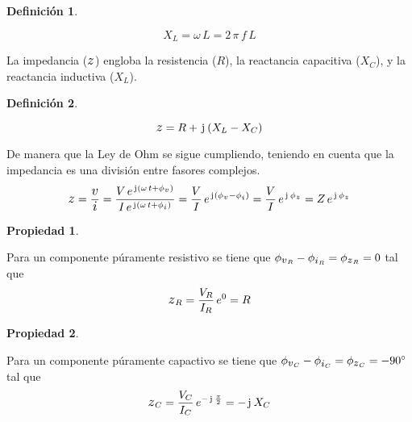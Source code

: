 \documentclass[a5paper,12pt,twoside]{book}
\newtheorem{defn}{{Definición}}[chapter]
\newtheorem{prop}{{Propiedad}}[chapter]
\begin{document}
\begin{mdframed}[style=MyFrame1]
    \begin{defn}
    \end{defn}
    \begin{equation*}
        X_L = \omega \, L = 2 \, \pi \, f \, L
    \end{equation*}
\end{mdframed}

La impedancia ($\impedance$) engloba la resistencia ($R$), la reactancia capacitiva ($X_C$), y la reactancia inductiva ($X_L$).

\begin{mdframed}[style=MyFrame1]
    \begin{defn}
    \end{defn}
    \begin{equation*}
        \impedance = R + \iu \bb{X_L - X_C}
    \end{equation*}
\end{mdframed}

De manera que la Ley de Ohm se sigue cumpliendo, teniendo en cuenta que la impedancia es una división entre fasores complejos.
\begin{equation*}
    \impedance = \frac{\voltage}{\current}
    = \frac{V \, e^{\iu \bb{\omega \, t + \phi_\voltage}}}{I \, e^{\iu \bb{\omega \, t + \phi_\current}}}
    = \frac{V}{I} \, e^{\iu \bb{\phi_\voltage - \phi_\current}}
    = \frac{V}{I} \, e^{\iu \, \phi_\impedance}
    = Z \, e^{\iu \, \phi_\impedance}
\end{equation*}

\begin{mdframed}[style=MyFrame1]
    \begin{prop}
    \end{prop}
    Para un componente púramente resistivo se tiene que $\phi_{\voltage_R} - \phi_{\current_R} = \phi_{\impedance_R} = 0$ tal que
    \begin{equation*}
        \impedance_R = \frac{V_R}{I_R} \, e^0 = R
    \end{equation*}
\end{mdframed}

\begin{mdframed}[style=MyFrame1]
    \begin{prop}
    \end{prop}
    Para un componente púramente capactivo se tiene que $\phi_{\voltage_C} - \phi_{\current_C} = \phi_{\impedance_C} = - \ang{90}$ tal que
    \begin{equation*}
        \impedance_C = \frac{V_C}{I_C} \, e^{- \iu \, \frac{\pi}{2}} = - \iu \, X_C
    \end{equation*}
\end{mdframed}
\end{document}

